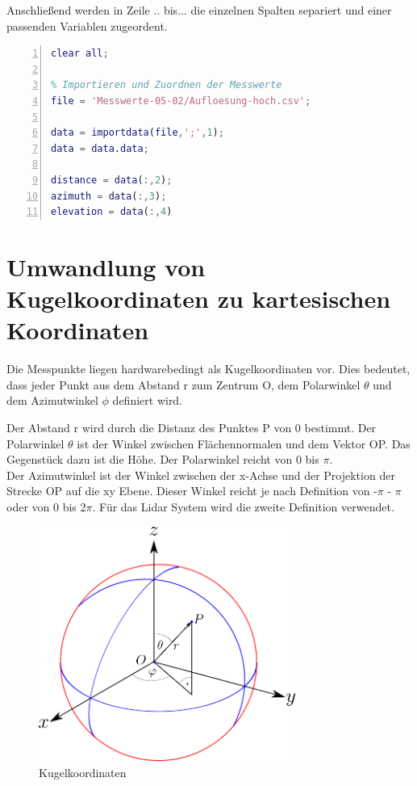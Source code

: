 Anschließend werden in Zeile .. bis... die einzelnen Spalten separiert und einer passenden Variablen zugeordent. 

\begin{lstlisting}[caption={Importieren und Zuordnen von .csv Dateien},language={Matlab}, label={import_data}, numbers=left]
% Anwendung zur Darstellung einer 3D Punktewolke aus einem LIDAR System
clear all;

% Importieren und Zuordnen der Messwerte
file = 'Messwerte-05-02/Aufloesung-hoch.csv';

data = importdata(file,';',1); 
data = data.data;

distance = data(:,2);
azimuth = data(:,3);
elevation = data(:,4)
\end{lstlisting}


\section{Umwandlung von Kugelkoordinaten zu kartesischen Koordinaten}

Die Messpunkte liegen hardwarebedingt als Kugelkoordinaten vor. Dies bedeutet, dass jeder Punkt aus dem Abstand r zum Zentrum O, dem Polarwinkel $\theta$ und dem Azimutwinkel $\phi$ definiert wird.

Der Abstand r wird durch die Distanz des Punktes P von 0 bestimmt. Der Polarwinkel $\theta$ ist der Winkel zwischen Flächennormalen und dem Vektor OP. Das Gegenstück dazu ist die Höhe.  Der Polarwinkel reicht von 0 bis $\pi$. \\
Der Azimutwinkel ist der Winkel zwischen der x-Achse und der Projektion der Strecke OP auf die xy Ebene. Dieser Winkel reicht je nach Definition von  -$\pi$ - $\pi$ oder von 0 bis 2$\pi$. Für das Lidar System wird die zweite Definition verwendet.

\begin{figure}[H]
	\centering
	\includegraphics[width=0.75\textwidth]{images/Auswertung/Kugelkoordinaten}
	\caption{Kugelkoordinaten}
	\label{kugelkoordinaten}
\end{figure}



